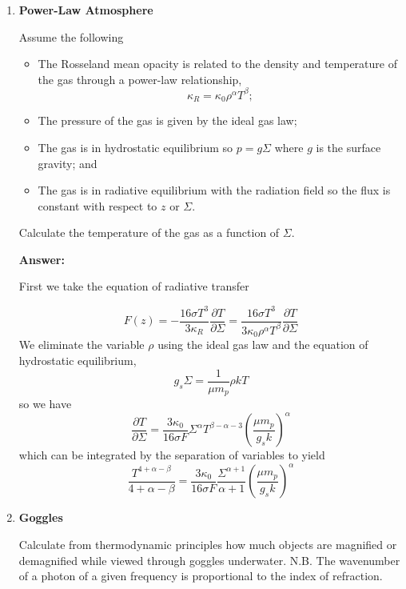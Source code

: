 \documentclass{article}
\begin{document}
\begin{enumerate}
\item {\bf Power-Law Atmosphere}

Assume the following
\begin{itemize}
\item The Rosseland mean opacity is related to the density and 
temperature of the gas through a power-law relationship,
      \begin{equation}
      \kappa_R = \kappa_0 \rho^\alpha T^\beta;
      \end{equation}
\item The pressure of the gas is given by the ideal gas law;
 \item The gas is in hydrostatic equilibrium so $p=g\Sigma$  where 
      $g$ is the surface gravity; and
 \item The gas is in radiative equilibrium with the radiation 
      field so the flux is constant with respect to $z$ or $\Sigma$.
    \end{itemize}
Calculate the temperature of the gas as a function of $\Sigma$.

{\bf Answer:}

First we take the equation of radiative transfer

\begin{equation}
F(z) = -\frac{16 \sigma T^3}{3\kappa_R} \frac{\partial T}{\partial \Sigma} = 
\frac{16 \sigma T^3}{3\kappa_0 \rho^\alpha T^\beta} \frac{\partial T}{\partial \Sigma}
\end{equation}
We eliminate the variable $\rho$ using the ideal gas law and the equation of
hydrostatic equilibrium,
\begin{equation}
g_s \Sigma = \frac{1}{\mu m_p} \rho k T
\end{equation}
so we have
\begin{equation}
\frac{\partial T}{\partial \Sigma} = \frac{3\kappa_0 }{16 \sigma F}
\Sigma^\alpha T^{\beta-\alpha-3} \left ( \frac{\mu m_p}{g_s k} \right )^\alpha
\end{equation}
which can be integrated by the separation of variables to yield
\begin{equation}
\frac{T^{4+\alpha-\beta}}{4+\alpha-\beta} = \frac{3\kappa_0 }{16 \sigma F}
\frac{\Sigma^{\alpha+1}}{\alpha+1}  \left ( \frac{\mu m_p}{g_s k} \right )^\alpha
\end{equation}
\setcounter{enumi}{6}
\item{\bf Goggles}

Calculate from thermodynamic principles how much objects are magnified or demagnified while viewed through goggles underwater. N.B. The wavenumber of a photon of a given frequency is proportional to the index of refraction.


\end{enumerate}
\end{document}

